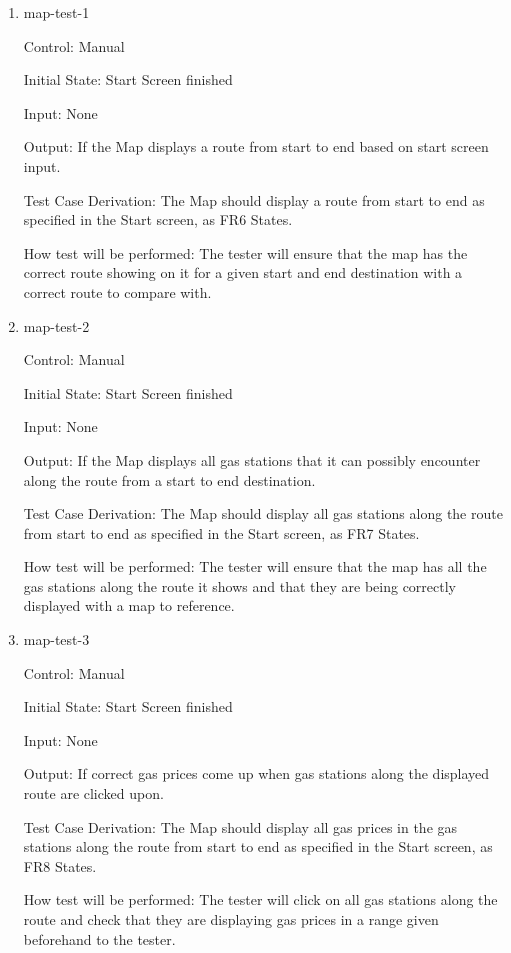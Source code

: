 \documentclass[12pt, titlepage]{article}
\begin{document}
\begin{enumerate}

\item{map-test-1\\}

Control: Manual
					
Initial State: Start Screen finished
					
Input: None
					
Output: If the Map displays a route from start to end based on start screen input.

Test Case Derivation: The Map should display a route from start to end as specified in the Start screen, as FR6 States.
					
How test will be performed: The tester will ensure that the map has the correct route showing on it for a given start and 
end destination with a correct route to compare with.
					
\item{map-test-2\\}

Control: Manual
					
Initial State: Start Screen finished
					
Input: None
					
Output: If the Map displays all gas stations that it can possibly encounter along the route from a start to end destination.

Test Case Derivation: The Map should display all gas stations along the route from start to end as specified in the Start screen, as FR7 States.
					
How test will be performed: The tester will ensure that the map has all the gas stations along the route it shows and that 
they are being correctly displayed with a map to reference.
					
\item{map-test-3\\}

Control: Manual
					
Initial State: Start Screen finished
					
Input: None
					
Output: If correct gas prices come up when gas stations along the displayed route are clicked upon.

Test Case Derivation: The Map should display all gas prices in the gas stations along the route from start to end as specified in the Start screen, as FR8 States.
					
How test will be performed: The tester will click on all gas stations along the route and check that they are 
displaying gas prices in a range given beforehand to the tester.

\end{enumerate}
\end{document}
